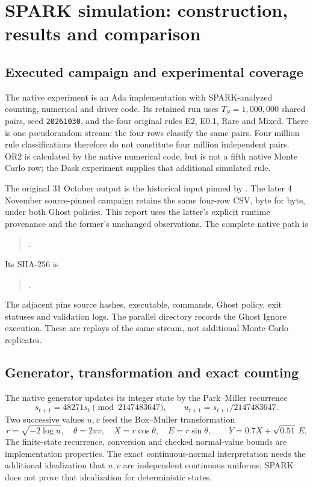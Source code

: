 \chapter{SPARK simulation: construction, results and comparison}
\label{sec:towers-spark-study}

\section{Executed campaign and experimental coverage}

The native experiment is an Ada implementation with SPARK-analyzed counting,
numerical and driver code. Its retained run uses \(T_S=1{,}000{,}000\)
shared pairs, seed \texttt{20261030}, and the four original rules E2, E0.1,
Rare and Mixed. There is one pseudorandom stream: the four rows classify the
same pairs. Four million rule classifications therefore do not constitute
four million independent pairs. OR2 is calculated by the native numerical
code, but is not a fifth native Monte Carlo row; the Dask experiment supplies
that additional simulated rule.

The original 31 October output is the historical input pinned by
. The later 4 November source-pinned campaign
retains the same four-row CSV, byte for byte, under both Ghost policies.
This report uses the latter's explicit runtime provenance and the former's
unchanged observations. The complete native path is
\begin{quote}\small
{}.
\end{quote}
Its SHA-256 is
\begin{quote}\small
{}.
\end{quote}
The adjacent  pins source hashes, executable, commands,
Ghost policy, exit statuses and validation logs. The parallel
 directory records the Ghost Ignore execution. These
are replays of the same stream, not additional Monte Carlo replicates.

\section{Generator, transformation and exact counting}

The native generator updates its integer state by the Park--Miller recurrence
\[
 s_{t+1}=48271s_t\pmod{2147483647},\qquad
 u_{t+1}=s_{t+1}/2147483647.
\]
Two successive values \(u,v\) feed the Box--Muller transformation
\[
 r=\sqrt{-2\log u},\quad \theta=2\pi v,\quad
 X=r\cos\theta,\quad E=r\sin\theta,
 \qquad Y=0.7X+\sqrt{0.51}\,E.
\]
The finite-state recurrence, conversion and checked normal-value bounds are
implementation properties. The exact continuous-normal interpretation needs
the additional idealization that \(u,v\) are independent continuous uniforms;
SPARK does not prove that idealization for deterministic states.

